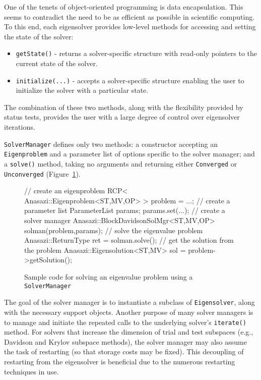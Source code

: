 \documentclass[acmtoms]{acmtrans2m}
\newcommand{\aspace}[1]{\texttt{#1}}
\begin{document}
One of the tenets of object-oriented programming is data
encapsulation. This seems to contradict the need to be as efficient
as possible in scientific computing. To this end, each eigensolver
provides low-level methods for accessing and setting the state of
the solver:
\begin{itemize}
  \item \verb!getState()! - returns a solver-specific structure with read-only pointers to
    the current state of the solver.
  \item \verb!initialize(...)! - accepts a solver-specific structure enabling the user to
    initialize the solver with a particular state.
\end{itemize}
The combination of these two methods, along with the flexibility
provided by status tests, provides the user with a large degree of
control over eigensolver iterations.


\aspace{SolverManager} defines only two methods: a constructor
accepting an \aspace{Eigenproblem} and a parameter list of
options specific to the solver manager; and a \verb!solve()! method, taking no
arguments and returning either \aspace{Converged} or
\aspace{Unconverged} (Figure~\ref{fig:examplesolve}).

\begin{figure}[htb]
\begin{center}
\begin{boxedverbatim}
// create an eigenproblem
RCP< Anasazi::Eigenproblem<ST,MV,OP> > problem = ...;
// create a parameter list
ParameterList params;
params.set(...);
// create a solver manager
Anasazi::BlockDavidsonSolMgr<ST,MV,OP> solman(problem,params);
// solve the eigenvalue problem
Anasazi::ReturnType ret = solman.solve();
// get the solution from the problem
Anasazi::Eigensolution<ST,MV> sol = problem->getSolution();
\end{boxedverbatim}
\end{center}
\caption{Sample code for solving an eigenvalue problem using a \aspace{SolverManager}}
\label{fig:examplesolve}
\end{figure}

The goal of the solver manager is to instantiate a subclass of \aspace{Eigensolver}, along
with the necessary support objects. Another purpose of many solver managers is to manage
and initiate the repeated calls to the underlying solver's \verb!iterate()! method. For
solvers that increase the dimension of trial and test subspaces (e.g., Davidson and Krylov
subspace methods), the solver manager may also assume the task of restarting (so that
storage costs may be fixed). This decoupling of restarting from the eigensolver is
beneficial due to the numerous restarting techniques in use.
\end{document}
